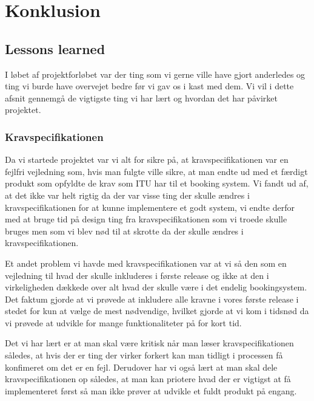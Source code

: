 \chapter{Konklusion}
\label{Konklusion}
\section{Lessons learned}
\label{Konklusion_Lessons}
I løbet af projektforløbet var der ting som vi gerne ville have gjort anderledes og ting vi burde have overvejet bedre før vi gav os i kast med dem. Vi vil i dette afsnit gennemgå de vigtigste ting vi har lært og hvordan det har påvirket projektet.

\subsection{Kravspecifikationen}
\label{Konklusion_Lessons_Krav}

Da vi startede projektet var vi alt for sikre på, at kravspecifikationen var en fejlfri vejledning som, hvis man fulgte ville sikre, at man endte ud med et færdigt produkt som opfyldte de krav som ITU har til et booking system. Vi fandt ud af, at det ikke var helt rigtig da der var visse ting der skulle ændres i kravspecifikationen for at kunne implementere et godt system, vi endte derfor med at bruge tid på design ting fra kravspecifikationen som vi troede skulle bruges men som vi blev nød til at skrotte da der skulle ændres i kravspecifikationen.

Et andet problem vi havde med kravspecifikationen var at vi så den som en vejledning til hvad der skulle inkluderes i første release og ikke at den i virkeligheden dækkede over alt hvad der skulle være i det endelig bookingsystem. Det faktum gjorde at vi prøvede at inkludere alle kravne i vores første release i stedet for kun at vælge de mest nødvendige, hvilket gjorde at vi kom i tidsnød da vi prøvede at udvikle for mange funktionaliteter på for kort tid.

Det vi har lært er at man skal være kritisk når man  læser kravspecifikationen således, at hvis der er ting der virker forkert kan man tidligt i processen få konfimeret om det er en fejl. Derudover har vi også lært at man skal dele kravspecifikationen op således, at man kan priotere hvad der er vigtigst at få implementeret først så man ikke prøver at udvikle et fuldt produkt på engang.

